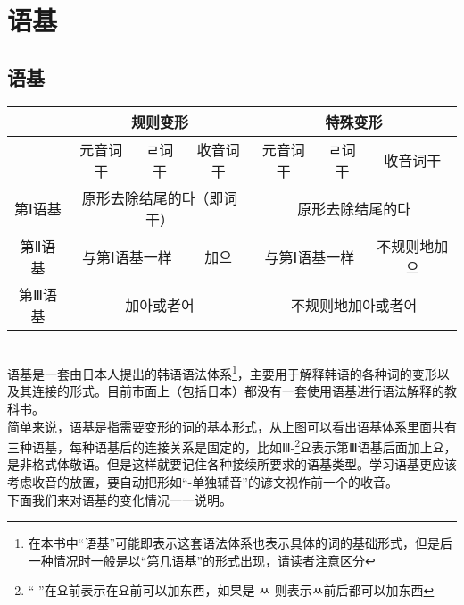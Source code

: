 \chapter{语基}\label{chap:eogi}
\section{语基}
\noindent\begin{tabular}{|c|c|c|c|c|c|c|}
	\hline
	                 & \multicolumn{3}{c|}{规则变形}          & \multicolumn{3}{c|}{特殊变形}                                                           \\\hline
	\diagbox{语基}{词干} & 元音词干                               & ㄹ词干                            & 收音词干                         & 元音词干   & ㄹ词干 & 收音词干 \\\hline
	第Ⅰ语基             & \multicolumn{3}{c|}{原形去除结尾的다（即词干）} & \multicolumn{3}{c|}{原形去除结尾的다}                                                       \\\hline
	第Ⅱ语基             & \multicolumn{2}{c|}{与第Ⅰ语基一样}       & 加으                             & \multicolumn{2}{c|}{与第Ⅰ语基一样} & 不规则地加으              \\\hline
	第Ⅲ语基             & \multicolumn{3}{c|}{加아或者어}         & \multicolumn{3}{c|}{不规则地加아或者어}                                                      \\\hline
\end{tabular}\\
\indent 语基是一套由日本人提出的韩语语法体系\footnote{在本书中“语基”可能即表示这套语法体系也表示具体的词的基础形式，但是后一种情况时一般是以“第几语基”的形式出现，请读者注意区分}，主要用于解释韩语的各种词的变形以及其连接的形式。目前市面上（包括日本）都没有一套使用语基进行语法解释的教科书。
\\\indent 简单来说，语基是指需要变形的词的基本形式，从上图可以看出语基体系里面共有三种语基，每种语基后的连接关系是固定的，比如Ⅲ-\footnote{``-''在요前表示在요前可以加东西，如果是-ㅆ-则表示ㅆ前后都可以加东西}요表示第Ⅲ语基后面加上요，是非格式体敬语。但是这样就要记住各种接续所要求的语基类型。学习语基更应该考虑收音的放置，要自动把形如“-单独辅音”的谚文视作前一个的收音。
\\\indent 下面我们来对语基的变化情况一一说明。
